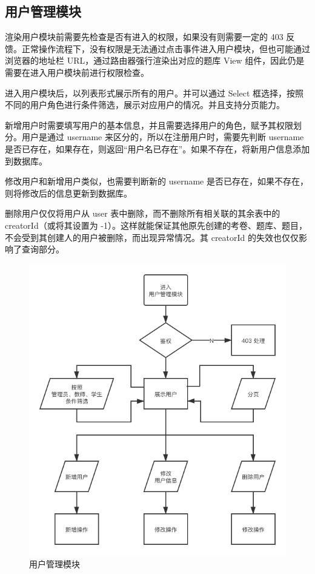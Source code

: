 \subsection{用户管理模块}
渲染用户模块前需要先检查是否有进入的权限，如果没有则需要一定的 403 反馈。正常操作流程下，没有权限是无法通过点击事件进入用户模块，但也可能通过浏览器的地址栏 URL，通过路由器强行渲染出对应的题库 View 组件，因此仍是需要在进入用户模块前进行权限检查。

进入用户模块后，以列表形式展示所有的用户。并可以通过 Select 框选择，按照不同的用户角色进行条件筛选，展示对应用户的情况。并且支持分页能力。

新增用户时需要填写用户的基本信息，并且需要选择用户的角色，赋予其权限划分。用户是通过 username 来区分的，所以在注册用户时，需要先判断 username 是否已存在，如果存在，则返回“用户名已存在”。如果不存在，将新用户信息添加到数据库。

修改用户和新增用户类似，也需要判断新的 username 是否已存在，如果不存在，则将修改后的信息更新到数据库。

删除用户仅仅将用户从 user 表中删除，而不删除所有相关联的其余表中的 creatorId（或将其设置为 -1）。这样就能保证其他原先创建的考卷、题库、题目，不会受到其创建人的用户被删除，而出现异常情况。其 creatorId 的失效也仅仅影响了查询部分。

\begin{figure}[htb]
    \centering
    \includegraphics[width=0.7\linewidth]{_images/用户管理模块.png}
    \caption{用户管理模块}
\end{figure}


